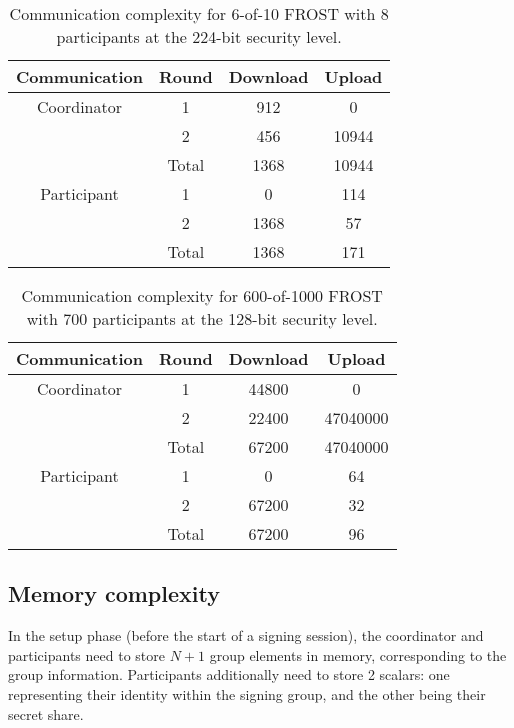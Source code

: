 \begin{table}
	\centering
	\begin{tabular}{c c c c}
		\toprule
		Communication & Round & Download & Upload \\ \midrule
		Coordinator & 1 & 912 & 0 \\
		            & 2 & 456 & 10944 \\
		            & Total & 1368 & 10944 \\
		\midrule
		Participant & 1 & 0 & 114 \\
		            & 2 & 1368 & 57 \\
		            & Total & 1368 & 171 \\
		\bottomrule
	\end{tabular}
	\caption{Communication complexity for 6-of-10 FROST with 8 participants at the 224-bit security level.}
\end{table}

\begin{table}
	\centering
	\begin{tabular}{c c c c}
		\toprule
		Communication & Round & Download & Upload \\ \midrule
		Coordinator & 1 & 44800 & 0 \\
		            & 2 & 22400 & 47040000 \\
		            & Total & 67200 & 47040000 \\
		\midrule
		Participant & 1 & 0 & 64 \\
		            & 2 & 67200 & 32 \\
		            & Total & 67200 & 96 \\
		\bottomrule
	\end{tabular}
	\caption{Communication complexity for 600-of-1000 FROST with 700 participants at the 128-bit security level.}
\end{table}

\subsection{Memory complexity}

In the setup phase (before the start of a signing session), the coordinator and
participants need to store $N + 1$ group elements in memory, corresponding to
the group information. Participants additionally need to store 2 scalars: one
representing their identity within the signing group, and the other being their
secret share.

